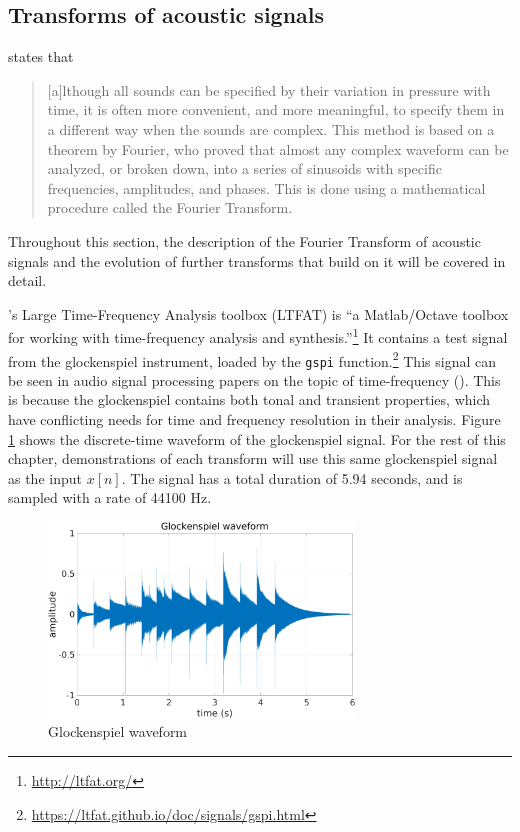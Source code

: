 \documentclass[report.tex]{subfiles}
\begin{document}
\subsection{Transforms of acoustic signals}
\label{sec:freqdomain}

\textcite[Chapter~2B]{moore} states that

\begin{quote}
	[a]lthough all sounds can be specified by their variation in pressure with time, it is often more convenient, and more meaningful, to specify them in a different way when the sounds are complex. This method is based on a theorem by Fourier, who proved that almost any complex waveform can be analyzed, or broken down, into a series of sinusoids with specific frequencies, amplitudes, and phases. This is done using a mathematical procedure called the Fourier Transform.
\end{quote}

Throughout this section, the description of the Fourier Transform of acoustic signals and the evolution of further transforms that build on it will be covered in detail.

\textcite{ltfat}'s Large Time-Frequency Analysis toolbox (LTFAT) is ``a Matlab/Octave toolbox for working with time-frequency analysis and synthesis.''\footnote{\url{http://ltfat.org/}} It contains a test signal from the glockenspiel instrument, loaded by the \Verb#gspi# function.\footnote{\url{https://ltfat.github.io/doc/signals/gspi.html}} This signal can be seen in audio signal processing papers on the topic of time-frequency (\cite{doerflerphd, balazs, jaillet, tfjigsaw, invertiblecqt, wmdct}). This is because the glockenspiel contains both tonal and transient properties, which have conflicting needs for time and frequency resolution in their analysis. Figure \ref{fig:glockwaveform} shows the discrete-time waveform of the glockenspiel signal. For the rest of this chapter, demonstrations of each transform will use this same glockenspiel signal as the input $x[n]$. The signal has a total duration of 5.94 seconds, and is sampled with a rate of 44100 Hz.

\begin{figure}[ht]
	\centering
	\includegraphics[width=0.725\textwidth]{./images-gspi/glock_waveform.png}
	\caption{Glockenspiel waveform}
	\label{fig:glockwaveform}
\end{figure}
\end{document}
